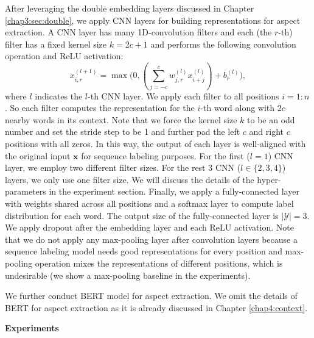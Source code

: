 After leveraging the double embedding layers discussed in Chapter \ref{chap3:sec:double}, we apply CNN layers for building representations for aspect extraction.
A CNN layer has many 1D-convolution filters and each (the $r$-th) filter has a fixed kernel size $k=2c+1$ and performs the following convolution operation and ReLU activation: 
\begin{equation}
x_{i,r}^{(l+1)}=\max\bigg(0, (\sum_{j=-c}^c w_{j,r}^{(l)} x_{i+j}^{(l)})+b_r^{(l)}\bigg),
\end{equation}
where $l$ indicates the $l$-th CNN layer. 
We apply each filter to all positions $i=1:n$.
So each filter computes the representation for the $i$-th word along with $2c$ nearby words in its context.  
Note that we force the kernel size $k$ to be an odd number and set the stride step to be 1 and further pad the left $c$ and right $c$ positions with all zeros.  
In this way, the output of each layer is well-aligned with the original input $\mathbf{x}$ for sequence labeling purposes.
For the first ($l=1$) CNN layer, we employ two different filter sizes. 
For the rest 3 CNN ($l \in \{2, 3, 4\}$) layers, we only use one filter size.
We will discuss the details of the hyper-parameters in the experiment section.
Finally, we apply a fully-connected layer with weights shared across all positions and a softmax layer to compute label distribution for each word.
The output size of the fully-connected layer is $|\mathcal{Y}|=3$.
We apply dropout after the embedding layer and each ReLU activation.
Note that we do not apply any max-pooling layer after convolution layers because a sequence labeling model needs good representations for every position and max-pooling operation mixes the representations of different positions, which is undesirable (we show a max-pooling baseline in the experiments).

We further conduct BERT model for aspect extraction. We omit the details of BERT for aspect extraction as it is already discussed in Chapter \ref{chap4:context}.

\textbf{Experiments}

\begin{table}
    \label{tab:dataset} 
    \centering
    \caption{Dataset for AE}
\end{table}

